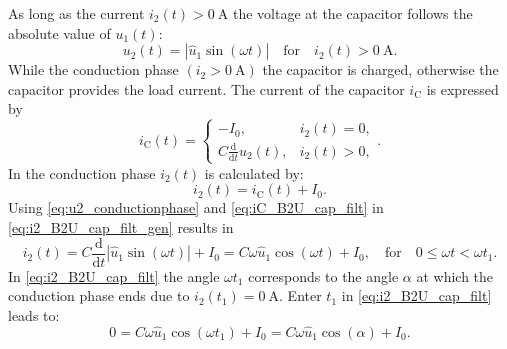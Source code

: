 \begin{solutionblock}
    As long as the current $i_\mathrm{2}(t)>\SI{0}{\ampere}$ the voltage at the 
    capacitor follows the absolute value of $u_\mathrm{1}(t)$:
    \begin{equation} 
        u_\mathrm{2}(t) = \left| \hat{u}_\mathrm{1}\sin(\omega t)\right| \quad \text{for} \quad i_\mathrm{2}(t)>\SI{0}{\ampere}.
        \label{eq:u2_conductionphase}
    \end{equation}
    While the conduction phase $(i_\mathrm{2} > \SI{0}{\ampere})$ the capacitor is charged, otherwise the capacitor provides the load current. 
    The current of the capacitor $i_\mathrm{C}$ is expressed by
    \begin{equation}
        i_\mathrm{C}(t) = \begin{cases}
            -I_\mathrm{0}, & i_2(t) = 0,\\
            C\frac{\mathrm{d}}{\mathrm{d}t}u_2(t), & i_2(t) > 0,
        \end{cases}.
        \label{eq:iC_B2U_cap_filt}
    \end{equation}
    In the conduction phase $i_\mathrm{2}(t)$ is calculated by:
    \begin{equation}
        i_2(t) = i_\mathrm{C}(t) + I_\mathrm{0}.
        \label{eq:i2_B2U_cap_filt_gen}
    \end{equation}
    Using \eqref{eq:u2_conductionphase} and \eqref{eq:iC_B2U_cap_filt} in \eqref{eq:i2_B2U_cap_filt_gen} results in
    \begin{equation}
        i_2(t) = C\frac{\mathrm{d}}{\mathrm{d}t}\left| \hat{u}_\mathrm{1}\sin(\omega t)\right| + I_0=
        C\omega \hat{u}_1 \cos(\omega t) + I_\mathrm{0}, \quad \text{for} \quad 0 \leq \omega t < \omega t_1.
        \label{eq:i2_B2U_cap_filt}
    \end{equation}
    In \eqref{eq:i2_B2U_cap_filt} the angle $\omega t_1$ corresponds to the angle $\alpha$ at which the conduction phase ends due to
    $i_\mathrm{2}(t_1)=\SI{0}{\ampere}$. Enter $t_1$ in \eqref{eq:i2_B2U_cap_filt} leads to:
    \begin{equation}
        0 = C\omega \hat{u}_\mathrm{1} \cos(\omega t_\mathrm{1}) + I_\mathrm{0} = C\omega \hat{u}_1 \cos(\alpha) + I_\mathrm{0} .
        \label{eq:alpha_B2U_cap_filt_gen}

\end{equation}
\end{solutionblock}
